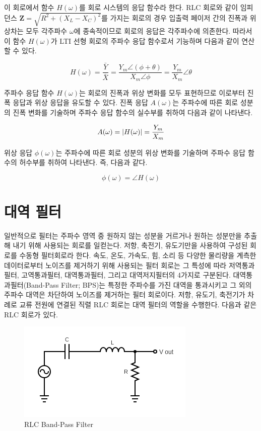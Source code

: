 \documentclass{article}
\begin{document}
이 회로에서 함수 $H(\omega)$를 회로 시스템의 응답 함수라 한다. RLC 회로와 같이 임피던스 $\boldsymbol{Z}=\sqrt{R^2+(X_L-X_C)^2}$를 가지는 회로의 경우 입출력 페이저 간의 진폭과 위상차는 모두 각주파수 $\omega$에 종속적이므로 회로의 응답은 각주파수에 의존한다. 따라서 이 함수 $H(\omega)$가 LTI 선형 회로의 주파수 응답 함수로서 기능하며 다음과 같이 연산할 수 있다.

\begin{equation}
    H(\omega)=\frac{\bar{Y}}{\bar{X}}=\frac{Y_m\angle(\phi+\theta)}{X_m\angle\phi}=\frac{Y_m}{X_m}\angle\theta
\end{equation}

주파수 응답 함수 $H(\omega)$는 회로의 진폭과 위상 변화를 모두 표현하므로 이로부터 진폭 응답과 위상 응답을 유도할 수 있다. 진폭 응답 $A(\omega)$는 주파수에 따른 회로 성분의 진폭 변화를 기술하며 주파수 응답 함수의 실수부를 취하여 다음과 같이 나타낸다.

\begin{equation}
    A(\omega)=\abs{H(\omega)}=\frac{Y_m}{X_m}
\end{equation}

위상 응답 $\phi(\omega)$는 주파수에 따른 회로 성분의 위상 변화를 기술하며 주파수 응답 함수의 허수부를 취하여 나타낸다. 즉, 다음과 같다.

\begin{equation}
    \phi(\omega)=\angle H(\omega)
\end{equation}


\section{대역 필터}
일반적으로 필터는 주파수 영역 중 원하지 않는 성분을 거르거나 원하는 성분만을 추출해 내기 위해 사용되는 회로를 일컫는다. 저항, 축전기, 유도기만을 사용하여 구성된 회로를 수동형 필터회로라 한다. 속도, 온도, 가속도, 힘, 소리 등 다양한 물리량을 계측한 데이터로부터 노이즈를 제거하기 위해 사용되는 필터 회로는 그 특성에 따라 저역통과필터, 고역통과필터, 대역통과필터, 그리고 대역저지필터의 4가지로 구분된다. 대역통과필터(Band-Pass Filter; BPS)는 특정한 주파수를 가진 대역을 통과시키고 그 외의 주파수 대역은 차단하여 노이즈를 제거하는 필터 회로이다. 저항, 유도기, 축전기가 차례로 교류 전원에 연결된 직렬 RLC 회로는 대역 필터의 역할을 수행한다. 다음과 같은 RLC 회로가 있다.

 \begin{figure}[h]
    \centering
    \includegraphics[scale=0.5]{./RLC Circuit.png}
    \caption{RLC Band-Pass Filter}
\end{figure}
\end{document}
